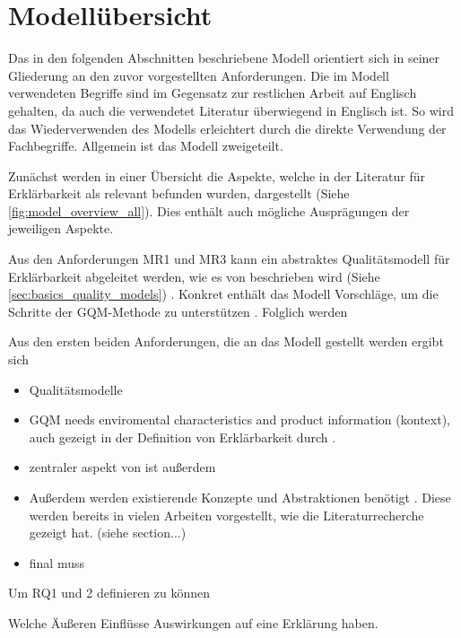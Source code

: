 \section{Modellübersicht}
\label{sec:model_overview}

Das in den folgenden Abschnitten beschriebene Modell orientiert sich in seiner Gliederung an den zuvor vorgestellten Anforderungen. Die im Modell verwendeten Begriffe sind im Gegensatz zur restlichen Arbeit auf Englisch gehalten, da auch die verwendetet Literatur überwiegend in Englisch ist. So wird das Wiederverwenden des Modells erleichtert durch die direkte Verwendung der Fachbegriffe. Allgemein ist das Modell zweigeteilt.

Zunächst werden in einer Übersicht die Aspekte, welche in der Literatur für Erklärbarkeit als relevant befunden wurden, dargestellt (Siehe \autoref{fig:model_overview_all}). Dies enthält auch mögliche Ausprägungen der jeweiligen Aspekte.

Aus den Anforderungen MR1 und MR3 kann ein abstraktes Qualitätsmodell für Erklärbarkeit abgeleitet werden, wie es von \citeauthor{schneider2012abenteuer} beschrieben wird (Siehe \autoref{sec:basics_quality_models}) \cite{schneider2012abenteuer}. Konkret enthält das Modell Vorschläge, um die Schritte der GQM-Methode zu unterstützen \cite{briand1995goal, schneider2012abenteuer}. Folglich werden 

Aus den ersten beiden Anforderungen, die an das Modell gestellt werden ergibt sich 

\begin{itemize}
    \item Qualitätsmodelle \cite{schneider2012abenteuer}
    \item GQM \cite{briand1995goal, schneider2012abenteuer} needs enviromental characteristics and product information (kontext), auch gezeigt in der Definition von Erklärbarkeit durch \cite{chazette_knowledge_nodate}.
    \item zentraler aspekt von \cite{briand1995goal} ist außerdem 
    \item Außerdem werden existierende Konzepte und Abstraktionen benötigt \cite{briand1995goal}. Diese werden bereits in vielen Arbeiten vorgestellt, wie die Literaturrecherche gezeigt hat. (siehe section...)
    \item final muss 
\end{itemize}

Um RQ1 und 2 definieren zu können

Welche Äußeren Einflüsse Auswirkungen auf eine Erklärung haben.

